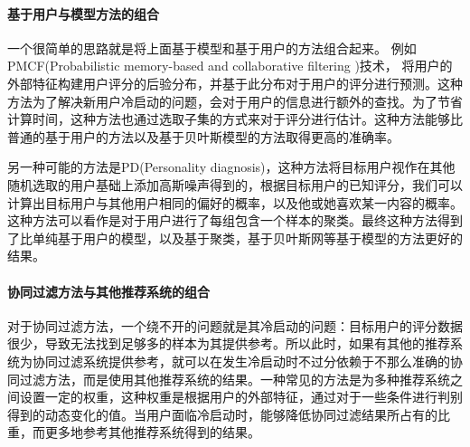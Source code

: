 \paragraph{基于用户与模型方法的组合}
一个很简单的思路就是将上面基于模型和基于用户的方法组合起来。
例如PMCF(Probabilistic memory-based and collaborative filtering )技术\cite{PMCF}，
将用户的外部特征构建用户评分的后验分布，并基于此分布对于用户的评分进行预测。这种方法为了解决新用户冷启动的问题，会对于用户的信息进行额外的查找。为了节省计算时间，这种方法也通过选取子集的方式来对于评分进行估计。这种方法能够比普通的基于用户的方法以及基于贝叶斯模型的方法取得更高的准确率。

另一种可能的方法是PD(Personality diagnosis)\cite{PD}，这种方法将目标用户视作在其他随机选取的用户基础上添加高斯噪声得到的，根据目标用户的已知评分，我们可以计算出目标用户与其他用户相同的偏好的概率，以及他或她喜欢某一内容的概率。这种方法可以看作是对于用户进行了每组包含一个样本的聚类。最终这种方法得到了比单纯基于用户的模型，以及基于聚类，基于贝叶斯网等基于模型的方法更好的结果。

\paragraph{协同过滤方法与其他推荐系统的组合}
对于协同过滤方法，一个绕不开的问题就是其冷启动的问题：目标用户的评分数据很少，导致无法找到足够多的样本为其提供参考。所以此时，如果有其他的推荐系统为协同过滤系统提供参考，就可以在发生冷启动时不过分依赖于不那么准确的协同过滤方法，而是使用其他推荐系统的结果。一种常见的方法是为多种推荐系统之间设置一定的权重，这种权重是根据用户的外部特征，通过对于一些条件进行判别得到的动态变化的值。当用户面临冷启动时，能够降低协同过滤结果所占有的比重，而更多地参考其他推荐系统得到的结果\cite{Hybrid}。